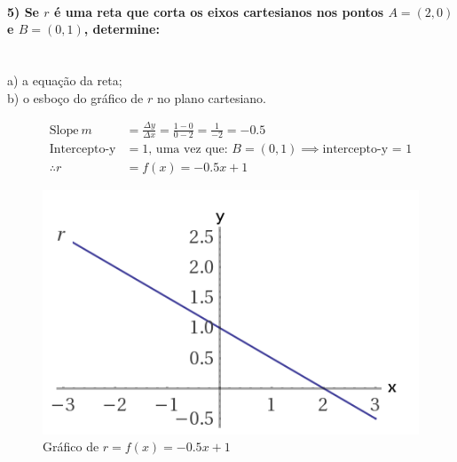 \documentclass[pdftex, brazil, 12pt, oneside]{article}
\begin{document}
\paragraph{5) Se $r$ é uma reta que corta os eixos cartesianos nos pontos $A=(2,0)$ e $B=(0,1)$,
determine:}\ \\
a) a equação da reta;\\
b) o esboço do gráfico de $r$ no plano cartesiano.

\begin{equation}
  \begin{split}
    \text{Slope}\ m &= \frac{\Delta y}{\Delta x} = \frac{1-0}{0-2} = \frac{1}{-2} = -0.5\\
    \text{Intercepto-y} &= 1\text{, uma vez que: } B=(0,1) \implies \text{intercepto-y = 1}\\
    \therefore r &= f(x) = -0.5x + 1
  \end{split}
\end{equation}

\begin{figure}[H]
  \begin{center}
    \caption{Gráfico de $r = f(x) = -0.5x + 1$}
    \label{fig:reta-r}
    \includegraphics[scale=0.5]{imagens/reta_r.png}
  \end{center}
\end{figure}


\end{document}
